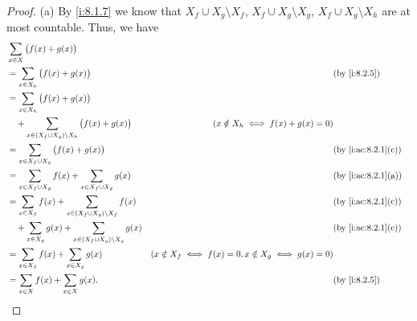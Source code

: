 \begin{proof}{(a)}
  By \cref{i:8.1.7} we know that \(X_f \cup X_g \setminus X_f\), \(X_f \cup X_g \setminus X_g\), \(X_f \cup X_g \setminus X_h\) are at most countable.
  Thus, we have
  \begin{align*}
     & \sum_{x \in X} \big(f(x) + g(x)\big)                                                                                                                           \\
     & = \sum_{x \in X_h} \big(f(x) + g(x)\big)                                       &                                                          & \by{i:8.2.5}       \\
     & = \sum_{x \in X_h} \big(f(x) + g(x)\big)                                                                                                                       \\
     & \quad + \sum_{x \in (X_f \cup X_g) \setminus X_h} \big(f(x) + g(x)\big)        & (x \notin X_h \iff f(x) + g(x) = 0)                                           \\
     & = \sum_{x \in X_f \cup X_g} \big(f(x) + g(x)\big)                              &                                                          & \by{i:ac:8.2.1}[c] \\
     & = \sum_{x \in X_f \cup X_g} f(x) + \sum_{x \in X_f \cup X_g} g(x)              &                                                          & \by{i:ac:8.2.1}[a] \\
     & = \sum_{x \in X_f} f(x) + \sum_{x \in (X_f \cup X_g) \setminus X_f} f(x)       &                                                          & \by{i:ac:8.2.1}[c] \\
     & \quad + \sum_{x \in X_g} g(x) + \sum_{x \in (X_f \cup X_g) \setminus X_g} g(x) &                                                          & \by{i:ac:8.2.1}[c] \\
     & = \sum_{x \in X_f} f(x) + \sum_{x \in X_g} g(x)                                & (x \notin X_f \iff f(x) = 0, x \notin X_g \iff g(x) = 0)                      \\
     & = \sum_{x \in X} f(x) + \sum_{x \in X} g(x).                                   &                                                          & \by{i:8.2.5}
  \end{align*}
\end{proof}

